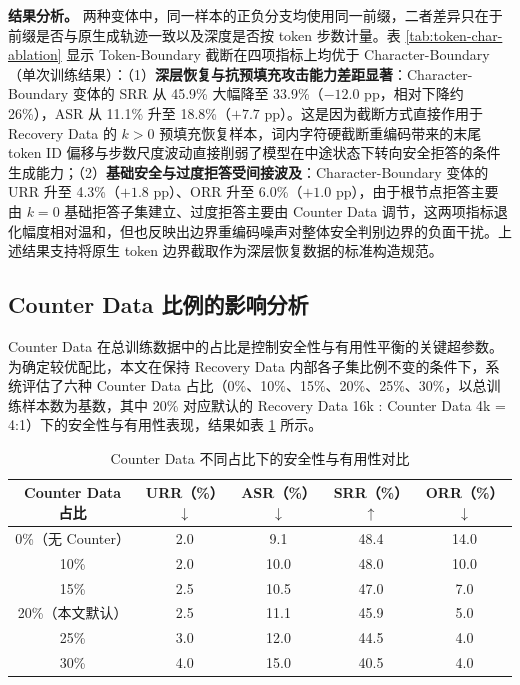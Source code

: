 \documentclass[fontset=fandol,type=master,campus=shenzhen,etitleauto=true]{hithesisbook}
\begin{document}
\noindent \textbf{结果分析。} 两种变体中，同一样本的正负分支均使用同一前缀，二者差异只在于前缀是否与原生成轨迹一致以及深度是否按 token 步数计量。表 \ref{tab:token-char-ablation} 显示 Token-Boundary 截断在四项指标上均优于 Character-Boundary（单次训练结果）：（1）\textbf{深层恢复与抗预填充攻击能力差距显著}：Character-Boundary 变体的 SRR 从 45.9\% 大幅降至 33.9\%（$-12.0$ pp，相对下降约 26\%），ASR 从 11.1\% 升至 18.8\%（$+7.7$ pp）。这是因为截断方式直接作用于 Recovery Data 的 $k>0$ 预填充恢复样本，词内字符硬截断重编码带来的末尾 token ID 偏移与步数尺度波动直接削弱了模型在中途状态下转向安全拒答的条件生成能力；（2）\textbf{基础安全与过度拒答受间接波及}：Character-Boundary 变体的 URR 升至 4.3\%（$+1.8$ pp）、ORR 升至 6.0\%（$+1.0$ pp），由于根节点拒答主要由 $k=0$ 基础拒答子集建立、过度拒答主要由 Counter Data 调节，这两项指标退化幅度相对温和，但也反映出边界重编码噪声对整体安全判别边界的负面干扰。上述结果支持将原生 token 边界截取作为深层恢复数据的标准构造规范。

\subsection{Counter Data 比例的影响分析}\label{counter-data-ux6bd4ux4f8bux7684ux5f71ux54cdux5206ux6790}

Counter Data 在总训练数据中的占比是控制安全性与有用性平衡的关键超参数。为确定较优配比，本文在保持 Recovery Data 内部各子集比例不变的条件下，系统评估了六种 Counter Data 占比（0\%、10\%、15\%、20\%、25\%、30\%，以总训练样本数为基数，其中 20\% 对应默认的 Recovery Data 16k : Counter Data 4k = 4:1）下的安全性与有用性表现，结果如表 \ref{tab:counter-ratio} 所示。

\begin{table}[htbp]
\centering
\caption{Counter Data 不同占比下的安全性与有用性对比}
\label{tab:counter-ratio}
\small
\renewcommand{\arraystretch}{1.1}
\begin{tabular}{c c c c c}
\toprule
\textbf{Counter Data 占比} & \textbf{URR（\%）$\downarrow$} & \textbf{ASR（\%）$\downarrow$} & \textbf{SRR（\%）$\uparrow$} & \textbf{ORR（\%）$\downarrow$} \\
\midrule
0\%（无 Counter） & 2.0 & 9.1 & 48.4 & 14.0 \\
10\% & 2.0 & 10.0 & 48.0 & 10.0 \\
15\% & 2.5 & 10.5 & 47.0 & 7.0 \\
20\%（本文默认） & 2.5 & 11.1 & 45.9 & 5.0 \\
25\% & 3.0 & 12.0 & 44.5 & 4.0 \\
30\% & 4.0 & 15.0 & 40.5 & 4.0 \\
\bottomrule
\end{tabular}
\end{table}
\end{document}
